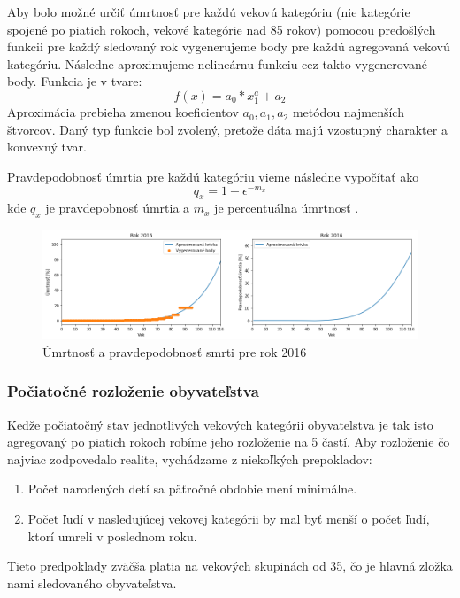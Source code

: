\documentclass[a4paper, 11pt]{article}
\begin{document}
Aby bolo možné určiť úmrtnosť pre každú vekovú kategóriu (nie kategórie spojené po piatich rokoch, vekové kategórie nad 85 rokov) pomocou predošlých funkcii pre každý sledovaný rok vygenerujeme body pre každú agregovaná vekovú kategóriu. Následne aproximujeme nelineárnu funkciu cez takto vygenerované body. Funkcia je v tvare:
$$f(x) = a_0 * x^a_1 + a_2$$
Aproximácia prebieha zmenou koeficientov $a_0, a_1, a_2$ metódou najmenších štvorcov. Daný typ funkcie bol zvolený, pretože dáta majú vzostupný charakter a konvexný tvar.

Pravdepodobnosť úmrtia pre každú kategóriu vieme následne vypočítať ako 
$$q_x = 1 - \epsilon^{-m_x} $$
kde $q_x$ je pravdepobnosť úmrtia a $m_x$ je percentuálna úmrtnosť \cite{prob}.
\begin{figure}[H]
\centering
\includegraphics[width=1\textwidth]{exp_2}
\caption{Úmrtnosť a pravdepodobnosť smrti pre rok 2016}
\end{figure}

\subsubsection*{Počiatočné rozloženie obyvateľstva}
Kedže počiatočný stav jednotlivých vekových kategórii obyvatelstva je tak isto agregovaný po piatich rokoch robíme jeho rozloženie na 5 častí. Aby rozloženie čo najviac zodpovedalo realite, vychádzame z niekoľkých prepokladov:
\begin{enumerate}
\item Počet narodených detí sa päťročné obdobie mení minimálne.
\item Počet ľudí v nasledujúcej vekovej kategórii by mal byť menší o počet ľudí, ktorí umreli v poslednom roku.
\end{enumerate}
Tieto predpoklady zväčša platia na vekových skupinách od 35, čo je hlavná zložka nami sledovaného obyvateľstva.
\end{document}
